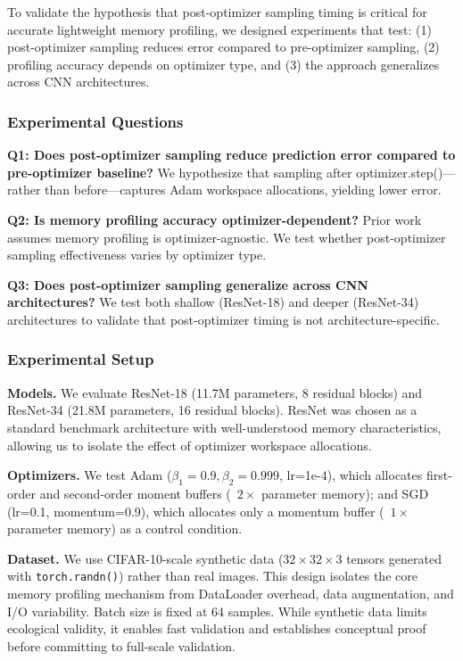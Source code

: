 
To validate the hypothesis that post-optimizer sampling timing is critical for accurate lightweight memory profiling, we designed experiments that test: (1) post-optimizer sampling reduces error compared to pre-optimizer sampling, (2) profiling accuracy depends on optimizer type, and (3) the approach generalizes across CNN architectures.

\subsubsection{Experimental Questions}

\textbf{Q1: Does post-optimizer sampling reduce prediction error compared to pre-optimizer baseline?} We hypothesize that sampling after optimizer.step()---rather than before---captures Adam workspace allocations, yielding lower error.

\textbf{Q2: Is memory profiling accuracy optimizer-dependent?} Prior work assumes memory profiling is optimizer-agnostic. We test whether post-optimizer sampling effectiveness varies by optimizer type.

\textbf{Q3: Does post-optimizer sampling generalize across CNN architectures?} We test both shallow (ResNet-18) and deeper (ResNet-34) architectures to validate that post-optimizer timing is not architecture-specific.

\subsubsection{Experimental Setup}

\textbf{Models.} We evaluate ResNet-18 (11.7M parameters, 8 residual blocks) and ResNet-34 (21.8M parameters, 16 residual blocks). ResNet was chosen as a standard benchmark architecture with well-understood memory characteristics, allowing us to isolate the effect of optimizer workspace allocations.

\textbf{Optimizers.} We test Adam ($\beta _{1}=0.9, \beta _{2}=0.999$, lr=1e-4), which allocates first-order and second-order moment buffers (~$2\times$ parameter memory); and SGD (lr=0.1, momentum=0.9), which allocates only a momentum buffer (~$1\times$ parameter memory) as a control condition.

\textbf{Dataset.} We use CIFAR-10-scale synthetic data ($32\times 32\times 3$ tensors generated with \texttt{torch.randn()}) rather than real images. This design isolates the core memory profiling mechanism from DataLoader overhead, data augmentation, and I/O variability. Batch size is fixed at 64 samples. While synthetic data limits ecological validity, it enables fast validation and establishes conceptual proof before committing to full-scale validation.

